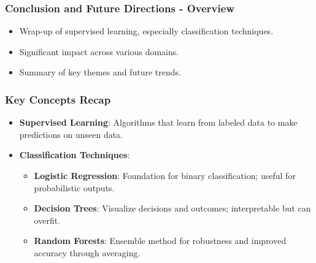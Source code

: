 \documentclass[aspectratio=169]{beamer}
\begin{document}
\begin{frame}[fragile]
    \frametitle{Conclusion and Future Directions - Overview}
    \begin{itemize}
        \item Wrap-up of supervised learning, especially classification techniques.
        \item Significant impact across various domains.
        \item Summary of key themes and future trends.
    \end{itemize}
\end{frame}

\begin{frame}[fragile]
    \frametitle{Key Concepts Recap}
    \begin{itemize}
        \item \textbf{Supervised Learning}: Algorithms that learn from labeled data to make predictions on unseen data.
        \item \textbf{Classification Techniques}:
            \begin{itemize}
                \item \textbf{Logistic Regression}: Foundation for binary classification; useful for probabilistic outputs.
                \item \textbf{Decision Trees}: Visualize decisions and outcomes; interpretable but can overfit.
                \item \textbf{Random Forests}: Ensemble method for robustness and improved accuracy through averaging.
            \end{itemize}
    \end{itemize}
\end{frame}
\end{document}
